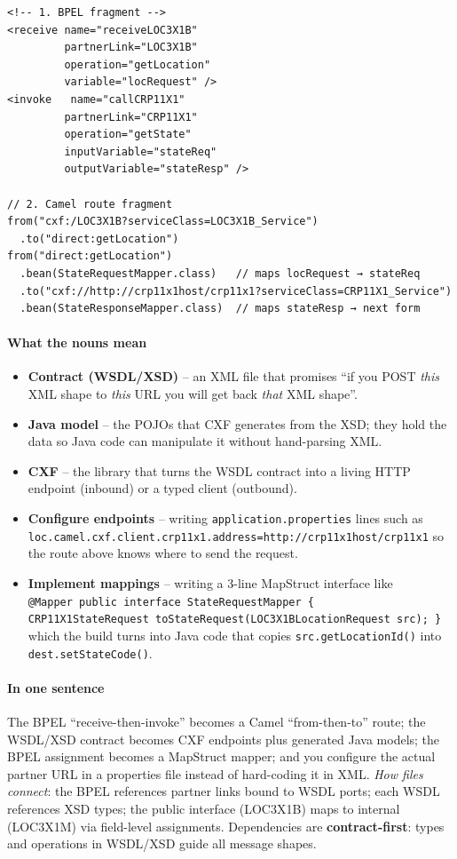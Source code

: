 \documentclass[11pt,a4paper]{article}
\begin{document}
\begin{verbatim}
<!-- 1. BPEL fragment -->
<receive name="receiveLOC3X1B"
         partnerLink="LOC3X1B"
         operation="getLocation"
         variable="locRequest" />
<invoke   name="callCRP11X1"
         partnerLink="CRP11X1"
         operation="getState"
         inputVariable="stateReq"
         outputVariable="stateResp" />

// 2. Camel route fragment
from("cxf:/LOC3X1B?serviceClass=LOC3X1B_Service")
  .to("direct:getLocation")
from("direct:getLocation")
  .bean(StateRequestMapper.class)   // maps locRequest → stateReq
  .to("cxf://http://crp11x1host/crp11x1?serviceClass=CRP11X1_Service")
  .bean(StateResponseMapper.class)  // maps stateResp → next form
\end{verbatim}

\paragraph*{What the nouns mean}
\begin{itemize}
  \item \textbf{Contract (WSDL/XSD)} – an XML file that promises “if you POST \emph{this} XML shape to \emph{this} URL you will get back \emph{that} XML shape”.  
  \item \textbf{Java model} – the POJOs that CXF generates from the XSD; they hold the data so Java code can manipulate it without hand-parsing XML.  
  \item \textbf{CXF} – the library that turns the WSDL contract into a living HTTP endpoint (inbound) or a typed client (outbound).  
  \item \textbf{Configure endpoints} – writing \texttt{application.properties} lines such as\\
  \texttt{loc.camel.cxf.client.crp11x1.address=http://crp11x1host/crp11x1} so the route above knows where to send the request.  
  \item \textbf{Implement mappings} – writing a 3-line MapStruct interface like\\
  \texttt{@Mapper public interface StateRequestMapper \{\\
  \hphantom{....}CRP11X1StateRequest toStateRequest(LOC3X1BLocationRequest src); \}}\\
  which the build turns into Java code that copies \texttt{src.getLocationId()} into \texttt{dest.setStateCode()}.  
\end{itemize}

\paragraph*{In one sentence}  
The BPEL “receive-then-invoke” becomes a Camel “from-then-to” route; the WSDL/XSD contract becomes CXF endpoints plus generated Java models; the BPEL assignment becomes a MapStruct mapper; and you configure the actual partner URL in a properties file instead of hard-coding it in XML.
\textit{How files connect}: the BPEL references partner links bound to WSDL ports; each WSDL references XSD types; the public interface (LOC3X1B) maps to internal (LOC3X1M) via field-level assignments. Dependencies are \textbf{contract-first}: types and operations in WSDL/XSD guide all message shapes.
\end{document}
